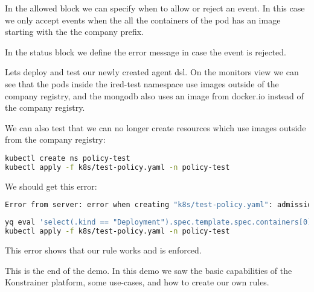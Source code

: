 In the allowed block we can specify when to allow or reject an event. In this case we only accept events when the all the containers of the pod has an image starting with the the company prefix.

In the status block we define the error message in case the event is rejected.

Lets deploy and test our newly created agent dsl. On the monitors view we can see that the pods inside the ired-test namespace use images outside of the company registry, and the mongodb also uses an image from docker.io instead of the company registry.

We can also test that we can no longer create resources which use images outside from the company registry:

\begin{lstlisting}[caption={TODO},language=bash,label=code:bashx]
kubectl create ns policy-test
kubectl apply -f k8s/test-policy.yaml -n policy-test
\end{lstlisting}

We should get this error:

\begin{lstlisting}[caption={TODO},language=bash,label=code:todo]
Error from server: error when creating "k8s/test-policy.yaml": admission webhook "only-internal-registry.btieger.me" denied the request: All images must be from the company registry.
\end{lstlisting}

\begin{lstlisting}[caption={TODO},language=bash,label=code:bashx]
yq eval 'select(.kind == "Deployment").spec.template.spec.containers[0].image = "tiegris/apples-users"' k8s/test-policy.yaml -i
kubectl apply -f k8s/test-policy.yaml -n policy-test
\end{lstlisting}

This error shows that our rule works and is enforced.

This is the end of the demo. In this demo we saw the basic capabilities of the Konstrainer platform, some use-cases, and how to create our own rules.
